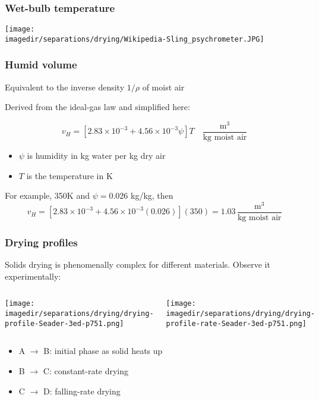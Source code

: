 \begin{frame}\frametitle{Wet-bulb temperature}
	\begin{center}
		\texttt{[image: \\imagedir/separations/drying/Wikipedia-Sling\_psychrometer.JPG]}
	\end{center}
\end{frame}

\begin{frame}\frametitle{Humid volume}
	
	Equivalent to the inverse density $1/\rho$ of moist air
	
	\vspace{12pt}
	Derived from the ideal-gas law and simplified here:
	\begin{exampleblock}{}
		\[ v_H = \left[ 2.83 \times 10^{-3} + 4.56 \times 10^{-3} \psi \right] T \quad \frac{\text{m}^3}{\text{kg moist air}} \]
	\end{exampleblock}
	\begin{itemize}
		\item	$\psi$ is humidity in kg water per kg dry air
		\item	$T$ is the temperature in K
	\end{itemize}
	
	\vspace{12pt}
	For example, 350K and $\psi = 0.026$ kg/kg, then 
	\[v_H = \left[2.83 \times 10^{-3} + 4.56 \times 10^{-3}(0.026)\right](350)  = 1.03\, \frac{\text{m}^3}{\text{kg moist air}}\]  
\end{frame}

\begin{frame}\frametitle{Drying profiles}
	Solids drying is phenomenally complex for different materials. Observe it experimentally:
	\begin{columns}[b]
			\begin{center}
				\texttt{[image: \\imagedir/separations/drying/drying-profile-Seader-3ed-p751.png]}
			\end{center}
			\begin{center}
				\texttt{[image: \\imagedir/separations/drying/drying-profile-rate-Seader-3ed-p751.png]}
			\end{center}
			\vspace{-7pt}
	\end{columns}

	\begin{itemize}
		\item	A $\rightarrow$ B: initial phase as solid heats up
		\item	B $\rightarrow$ C: constant-rate drying
		\item	C $\rightarrow$ D: falling-rate drying
	\end{itemize}
\end{frame}

